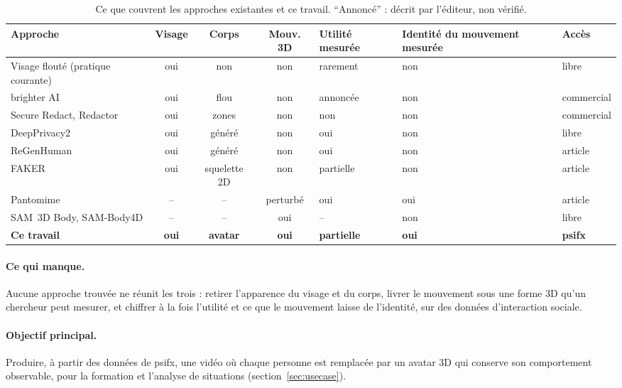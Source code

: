 \documentclass[11pt,a4paper]{report}
\begin{document}
\begin{table}[H]
\centering
\caption{Ce que couvrent les approches existantes et ce travail. \enquote{Annoncé} : décrit par l'éditeur, non vérifié.}
\label{tab:sota-recap}
\small
\begin{tabularx}{\textwidth}{@{}>{\raggedright\arraybackslash}p{3.1cm}ccc>{\raggedright\arraybackslash}p{1.5cm}>{\raggedright\arraybackslash}p{1.7cm}Y@{}}
\toprule
Approche & Visage & Corps & Mouv. 3D & Utilité mesurée & Identité du mouvement mesurée & Accès \\
\midrule
Visage flouté (pratique courante) & oui & non & non & rarement & non & libre \\
brighter AI \cite{brighterai} & oui & flou & non & annoncée & non & commercial \\
Secure Redact, Redactor \cite{dsar2025tools} & oui & zones & non & non & non & commercial \\
DeepPrivacy2 \cite{hukkelas2023deepprivacy2} & oui & généré & non & oui & non & libre \\
ReGenHuman \cite{regenhuman2026} & oui & généré & non & oui & non & article \\
FAKER \cite{faker2025} & oui & squelette 2D & non & partielle & non & article \\
Pantomime \cite{pantomime2026} & -- & -- & perturbé & oui & oui & article \\
SAM~3D Body, SAM-Body4D \cite{sam3dbody2026, sambody4d2025} & -- & -- & oui & -- & non & libre \\
\textbf{Ce travail} & \textbf{oui} & \textbf{avatar} & \textbf{oui} & \textbf{partielle} & \textbf{oui} & \textbf{psifx} \\
\bottomrule
\end{tabularx}
\end{table}

\paragraph{Ce qui manque.} Aucune approche trouvée ne réunit les trois : retirer l'apparence du visage et du corps, livrer le
mouvement sous une forme 3D qu'un chercheur peut mesurer, et chiffrer à la fois l'utilité et ce que le mouvement laisse de
l'identité, sur des données d'interaction sociale.

\paragraph{Objectif principal.} Produire, à partir des données de psifx, une vidéo où chaque personne est remplacée par un avatar 3D
qui conserve son comportement observable, pour la formation et l'analyse de situations (section~\ref{sec:usecase}).
\end{document}
